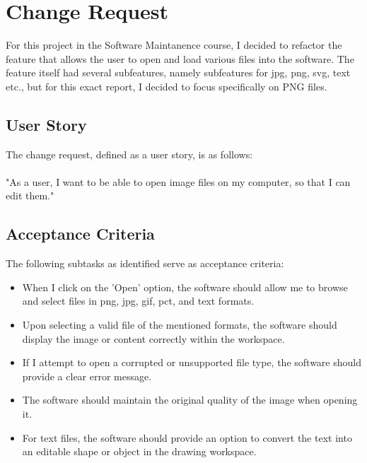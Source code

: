 \section{Change Request}
For this project in the Software Maintanence course, I decided to refactor the feature that allows the user to open and load various files into the software. The feature itself had several subfeatures, namely subfeatures for jpg, png, svg, text etc., but for this exact report, I decided to focus specifically on PNG files.

\subsection{User Story}
The change request, defined as a user story, is as follows:
\\\\
"As a user, I want to be able to open image files on my computer, so that I can edit them."

\subsection{Acceptance Criteria}
The following subtasks as identified serve as acceptance criteria:


\begin{itemize}
    \item When I click on the 'Open' option, the software should allow me to browse and select files in png, jpg, gif, pct, and text formats.
    \item Upon selecting a valid file of the mentioned formats, the software should display the image or content correctly within the workspace.
    \item If I attempt to open a corrupted or unsupported file type, the software should provide a clear error message.
    \item The software should maintain the original quality of the image when opening it.
    \item For text files, the software should provide an option to convert the text into an editable shape or object in the drawing workspace.
\end{itemize}
